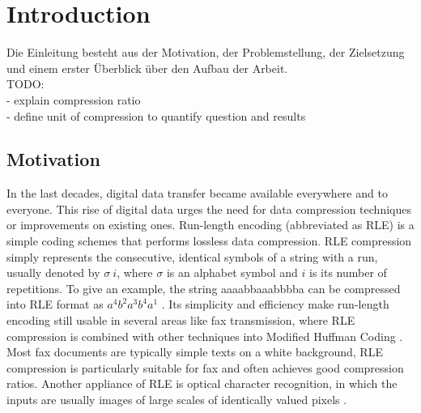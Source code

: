 
\chapter{Introduction}
\label{ch:Introduction}
Die Einleitung besteht aus der Motivation, der Problemstellung, der Zielsetzung und einem erster Überblick über den Aufbau der Arbeit. \\
TODO: \\
- explain compression ratio \\
- define unit of compression to quantify question and results \\

\section{Motivation}
\label{ch:Introduction:sec:Motivation}
\par{
In the last decades, digital data transfer became available everywhere and to everyone. This rise of digital data urges the need for data compression techniques or improvements on existing ones. Run-length encoding \cite{rle-patent} (abbreviated as RLE) is a simple coding schemes that performs lossless data compression. RLE compression simply represents the consecutive, identical symbols of a string with a run, usually denoted by $\sigma \ i$, where $\sigma$ is an alphabet symbol and $i$ is its number of repetitions. To give an example, the string aaaabbaaabbbba can be compressed into RLE format as  $ a^{4}b^{2}a^{3}b^{4}a^{1}$ . Its simplicity and efficiency make run-length encoding still usable in several areas like fax transmission, where RLE compression is combined with other techniques into Modified Huffman Coding \cite{fax-rle}. Most fax documents are typically simple texts on a white background, RLE compression is particularly suitable for fax and often achieves good compression ratios. Another appliance of RLE is optical character recognition, in which the inputs are usually images of large scales of identically valued pixels \cite{rle-bio}.
}

